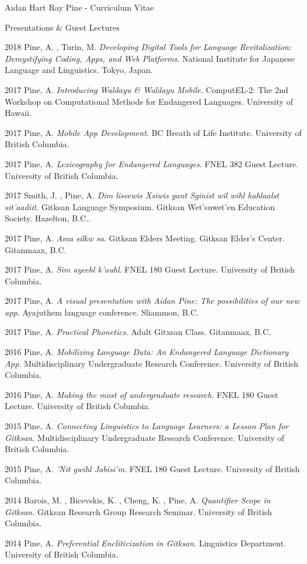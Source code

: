 \documentclass[12pt]{letter}
\begin{document}
\begin{cv}{ Aidan Hart Ray Pine  \space - \space   Curriculum Vitae}
\begin{cvlist}{Presentations \& Guest Lectures}
                    \item[2018]  Pine,  A. ,  Turin,  M.   \textit{Developing Digital Tools for Language Revitalization: Demystifying Coding, Apps, and Web Platforms}. National Institute for Japanese Language and Linguistics. Tokyo, Japan.  
                    \item[2017]  Pine,  A.   \textit{Introducing Waldayu \& Waldayu Mobile}. ComputEL-2: The 2nd Workshop on Computational Methods for Endangered Languages. University of Hawaii.  
                    \item[2017]  Pine,  A.   \textit{Mobile App Development}. BC Breath of Life Institute. University of British Columbia.  
                    \item[2017]  Pine,  A.   \textit{Lexicography for Endangered Languages}. FNEL 382 Guest Lecture. University of British Columbia.  
                    \item[2017]  Smith,  J. ,  Pine,  A.   \textit{Dim liseewis Xsiwis g̲ant Sginist wil wihl hahlaalst sit'aadiit}. Gitksan Language Symposium. Gitksan Wet'suwet'en Education Society. Hazelton, B.C..  
                    \item[2017]  Pine,  A.   \textit{Ama silkw sa}. Gitksan Elders Meeting. Gitksan Elder's Center. Gitanmaax, B.C.  
                    \item[2017]  Pine,  A.   \textit{Sim ayeehl k'uuhl}. FNEL 180 Guest Lecture. University of British Columbia.  
                    \item[2017]  Pine,  A.   \textit{A visual presentation with Aidan Pine: The possibilities of our new app}. Ayajuthem language conference. Sliammon, B.C.  
                    \item[2017]  Pine,  A.   \textit{Practical Phonetics}. Adult Gitxsan Class. Gitanmaax, B.C.  
                    \item[2016]  Pine,  A.   \textit{Mobilizing Language Data: An Endangered Language Dictionary App}. Multidisciplinary Undergraduate Research Conference. University of British Columbia.  
                    \item[2016]  Pine,  A.   \textit{Making the most of undergraduate research}. FNEL 180 Guest Lecture. University of British Columbia.  
                    \item[2015]  Pine,  A.   \textit{Connecting Linguistics to Language Learners: a Lesson Plan for Gitksan}. Multidisciplinary Undergraduate Research Conference. University of British Columbia.  
                    \item[2015]  Pine,  A.   \textit{'Nit gwihl Jabisi'm}. FNEL 180 Guest Lecture. University of British Columbia.  
                    \item[2014]  Barois,  M. ,  Bicevskis,  K. ,  Cheng,  K. ,  Pine,  A.   \textit{Quantifier Scope in Gitksan}. Gitksan Research Group Research Seminar. University of British Columbia.  
                    \item[2014]  Pine,  A.   \textit{Preferential Encliticization in Gitksan}. Linguistics Department. University of British Columbia.  
                   

\end{cvlist}
\end{cv}
\end{document}
